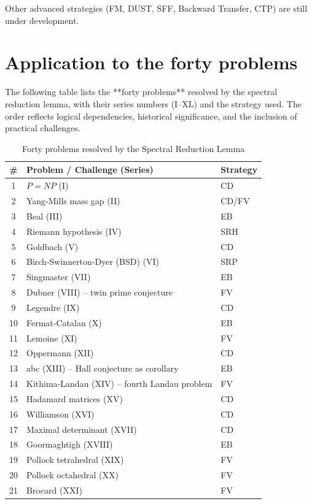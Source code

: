 \documentclass[11pt,a4paper]{article}
\begin{document}
Other advanced strategies (FM, DUST, SFF, Backward Transfer, CTP) are still under development.

\section{Application to the forty problems}

The following table lists the **forty problems** resolved by the spectral reduction lemma, with their series numbers (I–XL) and the strategy used. The order reflects logical dependencies, historical significance, and the inclusion of practical challenges.

\begin{center}
\small
\begin{longtable}{@{}cll@{}}
\caption{Forty problems resolved by the Spectral Reduction Lemma}\\
\toprule
\# & Problem / Challenge (Series) & Strategy \\
\midrule
1 & \(P = NP\) (I) & CD \\
2 & Yang‑Mills mass gap (II) & CD/FV \\
3 & Beal (III) & EB \\
4 & Riemann hypothesis (IV) & SRH \\
5 & Goldbach (V) & CD \\
6 & Birch‑Swinnerton‑Dyer (BSD) (VI) & SRP \\
7 & Singmaster (VII) & EB \\
8 & Dubner (VIII) – twin prime conjecture & FV \\
9 & Legendre (IX) & CD \\
10 & Fermat‑Catalan (X) & EB \\
11 & Lemoine (XI) & FV \\
12 & Oppermann (XII) & CD \\
13 & abc (XIII) – Hall conjecture as corollary & EB \\
14 & Kithima‑Landau (XIV) – fourth Landau problem & FV \\
15 & Hadamard matrices (XV) & CD \\
16 & Williamson (XVI) & CD \\
17 & Maximal determinant (XVII) & CD \\
18 & Goormaghtigh (XVIII) & EB \\
19 & Pollock tetrahedral (XIX) & FV \\
20 & Pollock octahedral (XX) & FV \\
21 & Brocard (XXI) & FV \\

\end{longtable}
\end{center}
\end{document}

